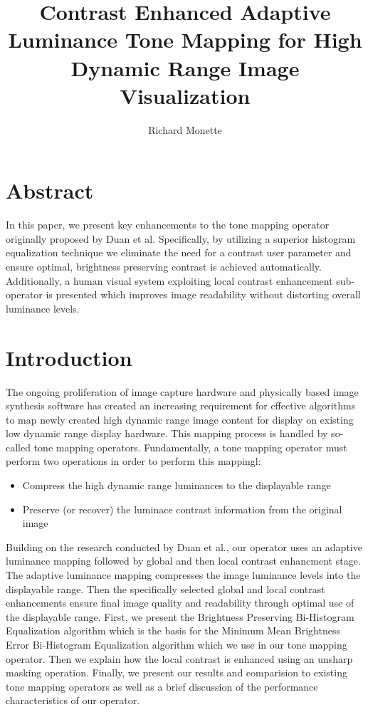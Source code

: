 \documentclass[twocolumn]{article}
\title{Contrast Enhanced Adaptive Luminance Tone Mapping for High Dynamic Range Image Visualization}
\author{Richard Monette}
\begin{document}
\maketitle

\section{Abstract}

In this paper, we present key enhancements to the tone mapping operator originally proposed by Duan et al.\cite{duan05} Specifically, by utilizing a superior histogram equalization technique we eliminate the need for a contrast user parameter and ensure optimal, brightness preserving contrast is achieved automatically. Additionally, a human visual system exploiting local contrast enhancement sub-operator is presented which improves image readability without distorting overall luminance levels.

\section{Introduction}

The ongoing proliferation of image capture hardware and physically based image synthesis software has created an increasing requirement for effective algorithms to map newly created high dynamic range image content for display on existing low dynamic range display hardware. This mapping process is handled by so-called tone mapping operators. Fundamentally, a tone mapping operator must perform two operations in order to perform this mappingl:

\begin{itemize}
\item Compress the high dynamic range luminances to the displayable range
\item Preserve (or recover) the luminace contrast information from the original image
\end{itemize}

Building on the research conducted by Duan et al.\cite{duan05}, our operator uses an adaptive luminance mapping followed by global and then local contrast enhancment stage. The adaptive luminance mapping compresses the image luminance levels into the displayable range. Then the specifically selected global and local contrast enhancements ensure final image quality and readability through optimal use of the displayable range. First, we present the Brightness Preserving Bi-Histogram Equalization algorithm which is the basis for the Minimum Mean Brightness Error Bi-Histogram Equalization algorithm which we use in our tone mapping operator. Then we explain how the local contrast is enhanced using an unsharp masking operation.
Finally, we present our results and comparision to existing tone mapping operators as well as a brief discussion of the performance characteristics of our operator. 
\end{document}
